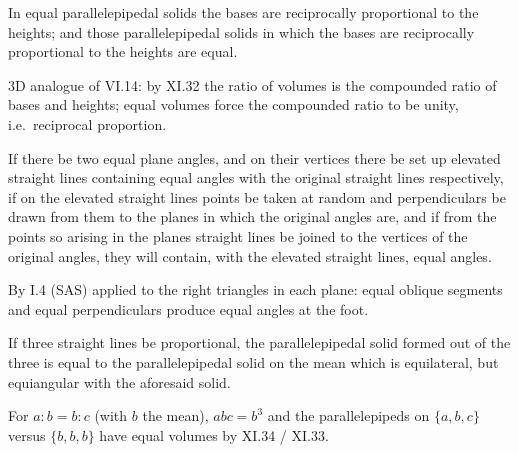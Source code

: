 \begin{claim}
\label{prop:XI.34}
In equal parallelepipedal solids the bases are reciprocally
proportional to the heights; and those parallelepipedal solids in
which the bases are reciprocally proportional to the heights are
equal.
\end{claim}
\begin{evidence}[Proof of XI.34]
\label{ev:XI.34}
3D analogue of VI.14: by XI.32 the ratio of volumes is the
compounded ratio of bases and heights; equal volumes force the
compounded ratio to be unity, i.e.\ reciprocal proportion.
\end{evidence}

\begin{claim}
\label{prop:XI.35}
If there be two equal plane angles, and on their vertices there be
set up elevated straight lines containing equal angles with the
original straight lines respectively, if on the elevated straight
lines points be taken at random and perpendiculars be drawn from them
to the planes in which the original angles are, and if from the
points so arising in the planes straight lines be joined to the
vertices of the original angles, they will contain, with the elevated
straight lines, equal angles.
\end{claim}
\begin{evidence}[Proof of XI.35]
\label{ev:XI.35}
By I.4 (SAS) applied to the right triangles in each plane: equal
oblique segments and equal perpendiculars produce equal angles at
the foot.
\end{evidence}

\begin{claim}
\label{prop:XI.36}
If three straight lines be proportional, the parallelepipedal solid
formed out of the three is equal to the parallelepipedal solid on the
mean which is equilateral, but equiangular with the aforesaid solid.
\end{claim}
\begin{evidence}[Proof of XI.36]
\label{ev:XI.36}
For $a : b = b : c$ (with $b$ the mean), $abc = b^3$ and the
parallelepipeds on $\{a, b, c\}$ versus $\{b, b, b\}$ have equal
volumes by XI.34 / XI.33.
\end{evidence}

